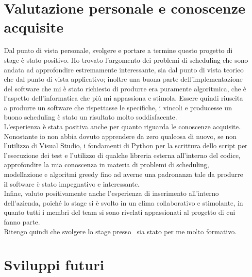 \section{Valutazione personale e conoscenze acquisite}
Dal punto di vista personale, svolgere e portare a termine questo progetto di stage è stato positivo. Ho trovato l'argomento dei problemi di scheduling che sono andata ad approfondire estremamente interessante, sia dal punto di vista teorico che dal punto di vista applicativo; inoltre una buona parte dell'implementazione del software che mi è stato richiesto di produrre era puramente algoritmica, che è l'aspetto dell'informatica che più mi appassiona e stimola. Essere quindi riuscita a produrre un software che rispettasse le specifiche, i vincoli e producesse un buono scheduling è stato un risultato molto soddisfacente.\\
L'esperienza è stata positiva anche per quanto riguarda le conoscenze acquisite. Nonostante io non abbia dovuto apprendere da zero qualcosa di nuovo, se non l'utilizzo di Visual Studio, i fondamenti di Python per la scrittura dello script per l'esecuzione dei test e l'utilizzo di qualche libreria esterna all'interno del codice, approfondire la mia conoscenza in materia di problemi di scheduling, modellazione e algoritmi greedy fino ad averne una padronanza tale da produrre il software è stato impegnativo e interessante. \\
Infine, valuto positivamente anche l'esperienza di inserimento all'interno dell'azienda, poiché lo stage si è svolto in un clima collaborativo e stimolante, in quanto tutti i membri del team si sono rivelati appassionati al progetto di cui fanno parte.\\ Ritengo quindi che svolgere lo stage presso \TS\ sia stato per me molto formativo.

\section{Sviluppi futuri}